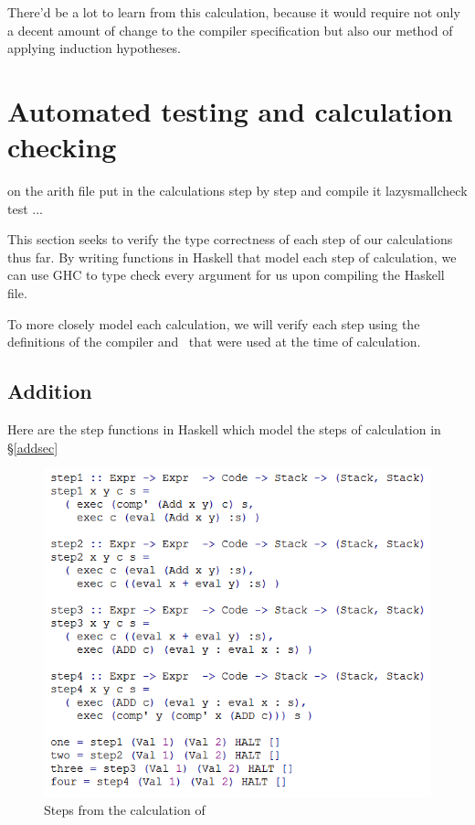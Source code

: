 \documentclass {article}
\begin{document}
There'd be a lot to learn from this calculation, 
because it would require not only a decent amount of change to
the compiler specification but also our method of applying induction
hypotheses.

\pagebreak
\section{Automated testing and calculation checking} \label{autotesting}

on the arith file put in the calculations
step by step and compile it
lazysmallcheck test ...

This section seeks to verify the type correctness of
each step of our calculations
thus far.
By writing functions in Haskell that model each step
of calculation, we can use  
GHC to type check every argument for us upon 
compiling the Haskell file.

To more closely model each calculation,
we will verify each step using the definitions of the compiler and \vm\
that were used at the time of calculation.

\subsection{Addition}

Here are the step functions in Haskell which model the
steps of calculation in \S\ref{addsec}
\begin{figure}[h] 
\includegraphics[scale=0.8]{Addsteps}
\caption{Steps from the calculation of \add}
\label{figadd}
\end{figure}
\end{document}
